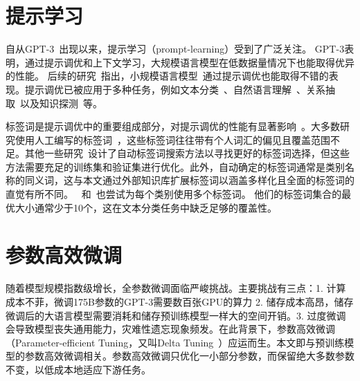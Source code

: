 \section{提示学习}
自从GPT-3~\cite{brown2020language}出现以来，提示学习（prompt-learning）受到了广泛关注。  
GPT-3表明，通过提示调优和上下文学习，大规模语言模型在低数据量情况下也能取得优异的性能。  
后续的研究~\cite{schick2020exploiting, schick2020s}指出，小规模语言模型~\cite{radford2018improving, devlin2019bert, liu2019roberta, lan2019albert}通过提示调优也能取得不错的表现。提示调优已被应用于多种任务，例如文本分类~\cite{schick2020exploiting}、自然语言理解~\cite{schick2020s, liu2021gpt}、关系抽取~\cite{han2021ptr,chen2021adaprompt}以及知识探测~\cite{petroni2019language, liu2021gpt}等。

标签词是提示调优中的重要组成部分，对提示调优的性能有显著影响~\cite{holtzman2021surface, gao2020making}。大多数研究使用人工编写的标签词~\cite{schick2020exploiting}，这些标签词往往带有个人词汇的偏见且覆盖范围不足。其他一些研究~\cite{gao2020making, shin2020autoprompt,liu2021gpt,schick2020automatically}设计了自动标签词搜索方法以寻找更好的标签词选择，但这些方法需要充足的训练集和验证集进行优化。此外，自动确定的标签词通常是类别名称的同义词，这与本文通过外部知识库扩展标签词以涵盖多样化且全面的标签词的直觉有所不同。  
~\citet{schick2020automatically}和~\citet{shin2020autoprompt}也尝试为每个类别使用多个标签词。  
他们的标签词集合的最优大小通常少于10个，这在文本分类任务中缺乏足够的覆盖性。

\section{参数高效微调}
随着模型规模指数级增长，全参数微调面临严峻挑战。主要挑战有三点：1. 计算成本不菲，微调175B参数的GPT-3需要数百张GPU的算力 2. 储存成本高昂，储存微调后的大语言模型需要消耗和储存预训练模型一样大的空间开销。3. 过度微调会导致模型丧失通用能力，灾难性遗忘现象频发。在此背景下，参数高效微调（Parameter-efficient Tuning，又叫Delta Tuning~\cite{ding2022delta}）应运而生。本文即与预训练模型的参数高效微调相关。参数高效微调只优化一小部分参数，而保留绝大多数参数不变，以低成本地适应下游任务。

